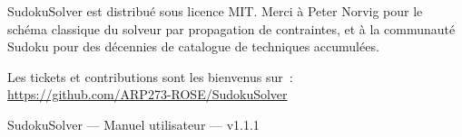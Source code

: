 SudokuSolver est distribué sous licence MIT. Merci à Peter Norvig pour
le schéma classique du solveur par propagation de contraintes, et à la
communauté Sudoku pour des décennies de catalogue de techniques
accumulées.

\medskip
Les tickets et contributions sont les bienvenus sur~:\\
\url{https://github.com/ARP273-ROSE/SudokuSolver}

\vfill
\begin{center}
\color{midblue}\small
SudokuSolver --- Manuel utilisateur --- v1.1.1
\end{center}

